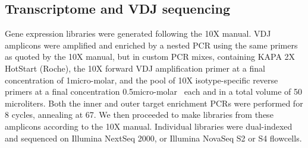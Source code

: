 \subsection{Transcriptome and VDJ sequencing}
\noindent Gene expression libraries were generated following the 10X manual. VDJ amplicons were amplified and enriched by a nested PCR using the same primers as quoted by the 10X manual, but in custom PCR mixes, containing KAPA 2X HotStart (Roche), the 10X forward VDJ amplification primer at a final concentration of 1micro-molar, and the pool of 10X isotype-specific reverse primers at a final concentration 0.5micro-molar ~each and in a total volume of 50 microliters. Both the inner and outer target enrichment PCRs were performed for 8 cycles, annealing at 67\celsius. We then proceeded to make libraries from these amplicons according to the 10X manual. Individual libraries were dual-indexed and sequenced on Illumina NextSeq 2000, or Illumina NovaSeq S2 or S4 flowcells. 

